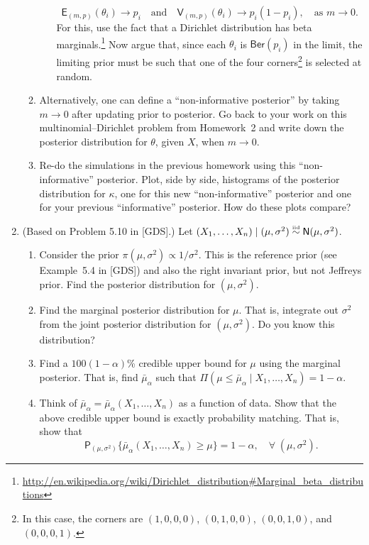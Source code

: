 \documentclass[a4paper,12pt]{article}
\newcommand{\E}{\mathsf{E}}
\newcommand{\var}{\mathsf{V}}
\newcommand{\prob}{\mathsf{P}}
\newcommand{\iid}{\overset{\text{\tiny iid}}{\sim}}
\newcommand{\nm}{\mathsf{N}}
\newcommand{\ber}{\mathsf{Ber}}
\begin{document}
\begin{enumerate}
\begin{enumerate}
\begin{enumerate}
\[ \E_{(m,p)}(\theta_i) \to p_i \quad \text{and} \quad \var_{(m,p)}(\theta_i) \to p_i(1-p_i), \quad \text{as $m \to 0$}. \]
For this, use the fact that a Dirichlet distribution has beta marginals.\footnote{\url{http://en.wikipedia.org/wiki/Dirichlet_distribution#Marginal_beta_distributions}}  Now argue that, since each $\theta_i$ is $\ber(p_i)$ in the limit, the limiting prior must be such that one of the four corners\footnote{In this case, the corners are $(1,0,0,0)$, $(0,1,0,0)$, $(0,0,1,0)$, and $(0,0,0,1)$.} is selected at random.  
\end{enumerate}
\item Alternatively, one can define a ``non-informative posterior'' by taking $m \to 0$ after updating prior to posterior.  Go back to your work on this multinomial--Dirichlet problem from Homework~2 and write down the posterior distribution for $\theta$, given $X$, when $m \to 0$.  
\item Re-do the simulations in the previous homework using this ``non-informative'' posterior.  Plot, side by side, histograms of the posterior distribution for $\kappa$, one for this new ``non-informative'' posterior and one for your previous ``informative'' posterior.  How do these plots compare?
\end{enumerate}

\item (Based on Problem 5.10 in [GDS].) Let $(X_1,\ldots,X_n) \mid (\mu, \sigma^2) \iid \nm(\mu, \sigma^2)$.  %
\begin{enumerate}
\item Consider the prior $\pi(\mu, \sigma^2) \propto 1/\sigma^2$.  This is the reference prior (see Example~5.4 in [GDS]) and also the right invariant prior, but not Jeffreys prior.  Find the posterior distribution for $(\mu, \sigma^2)$.  
\item Find the marginal posterior distribution for $\mu$.  That is, integrate out $\sigma^2$ from the joint posterior distribution for $(\mu,\sigma^2)$.  Do you know this distribution?
\item Find a $100(1-\alpha)$\% credible upper bound for $\mu$ using the marginal posterior.  That is, find $\bar\mu_\alpha$ such that $\Pi(\mu \leq \bar\mu_\alpha \mid X_1,\ldots,X_n) = 1-\alpha$.  
\item Think of $\bar\mu_\alpha=\bar\mu_\alpha(X_1,\ldots,X_n)$ as a function of data.  Show that the above credible upper bound is exactly probability matching.  That is, show that 
\[ \prob_{(\mu,\sigma^2)}\{\bar\mu_\alpha(X_1,\ldots,X_n) \geq \mu\} = 1-\alpha, \quad \forall \; (\mu,\sigma^2). \]
\end{enumerate}


\end{enumerate}
\end{document}
